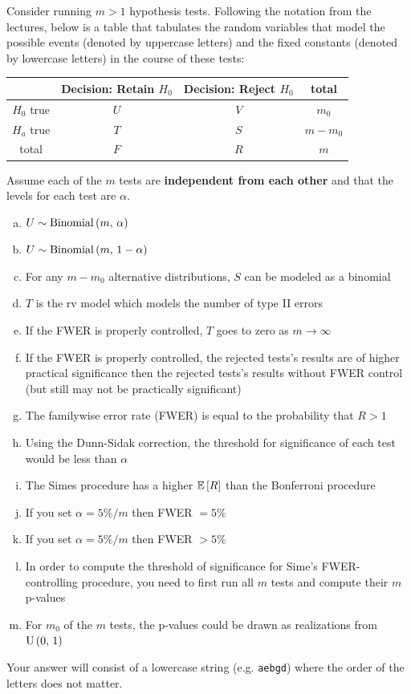 \documentclass[12pt,landscape]{article}
\newcommand{\instr}{\small Your answer will consist of a lowercase string (e.g. \texttt{aebgd}) where the order of the letters does not matter. \normalsize}
\begin{document}

\problem{} Consider running $m > 1$ hypothesis tests. Following the notation from the lectures, below is a table that tabulates the random variables that model the possible events (denoted by uppercase letters) and the fixed constants (denoted by lowercase letters) in the course of these tests:

\begin{table}[h]
\centering
\begin{tabular}{c|cc|c}
& Decision: Retain $H_0$ & Decision: Reject $H_0$ & total \\\hline
$H_0$ true & $U$ & $V$ & $m_0$ \\
$H_a$ true & $T$ & $S$ & $m - m_0$ \\ \hline
total & $F$ & $R$ & $m$
\end{tabular}
\end{table}
\FloatBarrier

Assume each of the $m$ tests are \textbf{independent from each other} and that the levels for each test are $\alpha$.

\vspace{-0.2cm}\benum{} 

\begin{enumerate}[(a)]
\item $U \sim \mathrm{Binomial}\left(m,\,\alpha\right)$ 
\item $U \sim \mathrm{Binomial}\left(m,\,1 - \alpha\right)$ 
\item For any $m -m_0$ alternative distributions, $S$ can be modeled as a binomial
\item $T$ is the rv model which models the number of type II errors
\item If the FWER is properly controlled, $T$ goes to zero as $m \rightarrow \infty$
\item If the FWER is properly controlled, the rejected tests's results are of higher practical significance then the rejected tests's results without FWER control (but still may not be practically significant)
\item The familywise error rate (FWER) is equal to the probability that $R > 1$
\item Using the Dunn-Sidak correction, the threshold for significance of each test would be less than $\alpha$
\item The Simes procedure has a higher $\mathbb{E}\left[R\right]$ than the Bonferroni procedure

\item If you set $\alpha = 5\% / m$ then FWER $=5\%$
\item If you set $\alpha = 5\% / m$ then FWER $> 5\%$

\item In order to compute the threshold of significance for Sime's FWER-controlling procedure, you need to first run all $m$ tests and compute their $m$ p-values
\item For $m_0$ of the $m$ tests, the p-values could be drawn as realizations from $\mathrm{U}\left(0,\,1\right)$
\end{enumerate}
\eenum\instr\pagebreak
\end{document}
